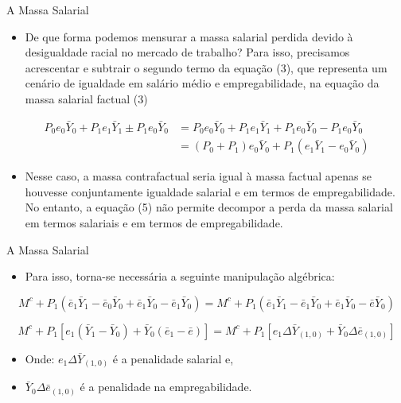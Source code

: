 \documentclass[10pt, xcolor=x11names,compress]{beamer}
\begin{document}
	\begin{frame}{A Massa Salarial}
	\begin{itemize}
		\item 	De que forma podemos mensurar a massa salarial perdida devido à desigualdade racial no mercado de trabalho? Para isso, precisamos acrescentar e subtrair o segundo termo da equação (3), que representa um cenário de igualdade em salário médio e empregabilidade, na equação da massa salarial factual (3)
		\end{itemize}
	\begin{align}
	P_{0}e_{0}\bar{Y}_{0} + P_{1}e_{1}\bar{Y}_{1} \pm P_{1}e_{0}\bar{Y}_{0} &= P_{0}e_{0}\bar{Y}_{0} + P_{1}e_{1}\bar{Y}_{1} + P_{1}e_{0}\bar{Y}_{0} - P_{1}e_{0}\bar{Y}_{0} \\
	&= (P_{0} +  P_{1})e_{0}\bar{Y}_{0} + P_{1}(e_{1}\bar{Y}_{1} - e_{0}\bar{Y}_{0})
	\end{align}
		\begin{itemize}
		\item	Nesse caso, a massa contrafactual seria igual à massa factual apenas se houvesse conjuntamente igualdade salarial e em termos de empregabilidade. No entanto, a equação (5) não permite decompor a perda da massa salarial em termos salariais e em termos de empregabilidade.
		\end{itemize}
	\end{frame}	

	\begin{frame}{A Massa Salarial}
	\begin{itemize}
		\item 	Para isso, torna-se necessária a seguinte manipulação algébrica: 
	\end{itemize}
		\begin{equation}
		M^{c} + P_{1}(\bar{e}_{1}\bar{Y}_{1} - \bar{e}_{0}\bar{Y}_{0} + \bar{e}_{1}\bar{Y}_{0} - \bar{e}_{1}\bar{Y}_{0}) = M^{c} + P_{1}(\bar{e}_{1}\bar{Y}_{1} - \bar{e}_{1}\bar{Y}_{0} + \bar{e}_{1}\bar{Y}_{0} - \bar{e}\bar{Y}_{0})
	\end{equation}
	
	\begin{equation}
		M^{c} + P_{1}[e_{1}(\bar{Y}_{1} - \bar{Y}_{0}) + \bar{Y}_{0}(\bar{e}_{1} - \bar{e} )] =  M^{c} + P_{1}[e_{1}\Delta \bar{Y}_{(1,0)} + \bar{Y}_{0}\Delta \bar{e}_{(1,0)}]
	\end{equation}
	\begin{itemize}
		\item Onde: $e_{1}\Delta \bar{Y}_{(1,0)}$ é a penalidade salarial e,
		\item 	$\bar{Y}_{0}\Delta \bar{e}_{(1,0)}$ é a penalidade na empregabilidade.
		\end{itemize}
	\end{frame}	
		
\end{document}
